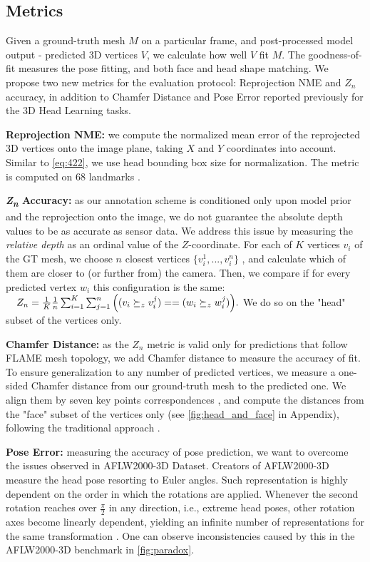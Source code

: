 \documentclass[10pt,twocolumn,letterpaper]{article}
\begin{document}
\subsection{Metrics}\label{ssec:benchmark}
Given a ground-truth mesh $M$ on a particular frame, and post-processed model output - predicted 3D vertices $V$, we calculate how well $V$ fit $M$. 
The goodness-of-fit measures the pose fitting, and both face and head shape matching. We propose two new metrics for the evaluation protocol: Reprojection NME and $Z_{n}$ accuracy, in addition to Chamfer Distance and Pose Error reported previously for the 3D Head Learning tasks.

\textbf{Reprojection NME:} we compute the normalized mean error of the reprojected 3D vertices onto the image plane, taking $X$ and $Y$ coordinates into account. Similar to \cref{eq:422}, we use head bounding box size for normalization. The metric is computed on 68 landmarks \cite{multipie}.



\textbf{\textit{Z\textsubscript{n}} Accuracy:}\label{ssec:zn} as our annotation scheme is conditioned only upon model prior and the reprojection onto the image, we do not guarantee the absolute depth values to be as accurate as sensor data.
We address this issue by measuring the \emph{relative depth} as an ordinal value of the $Z$-coordinate. 
For each of $K$ vertices $v_i$ of the GT mesh, we choose $n$ closest vertices $\{v_i^1, ..., v_i^n\}$ , and calculate which of them are closer to (or further from) the camera. Then, we compare if for every predicted vertex $w_i$ this configuration is the same:\\
$\text{\quad}Z_n = \frac{1}{K}\frac{1}{n}\sum_{i=1}^K \sum_{j=1}^n\Big((v_i \succeq_z v_i^j) == (w_i \succeq_z w_i^j)\Big).$
We do so on the "head" subset of the vertices only.


\textbf{Chamfer Distance:} as the $Z_n$ metric is valid only for predictions that follow FLAME mesh topology, we add Chamfer distance to measure the accuracy of fit. To ensure generalization to any number of predicted vertices, we measure a one-sided Chamfer distance from our ground-truth mesh to the predicted one. We align them by seven key points correspondences \cite{RingNet}, and compute the distances from the "face" subset of the vertices only (see \cref{fig:head_and_face} in Appendix), following the traditional approach \cite{RingNet, 3d-face-modeling-from-diverse-raw-scan-data}.

\textbf{Pose Error:} measuring the accuracy of pose prediction, we want to overcome the issues observed in AFLW2000-3D\cite{koestinger11a} Dataset. Creators of AFLW2000-3D measure the head pose resorting to Euler angles. Such representation is highly dependent on the order in which the rotations are applied. Whenever the second rotation reaches over $\frac{\pi}{2}$ in any direction, i.e., extreme head poses, other rotation axes become linearly dependent, yielding an infinite number of representations for the same transformation \cite{eruler_rotation}.
One can observe inconsistencies caused by this in the AFLW2000-3D\cite{koestinger11a} benchmark in \cref{fig:paradox}.
\end{document}
